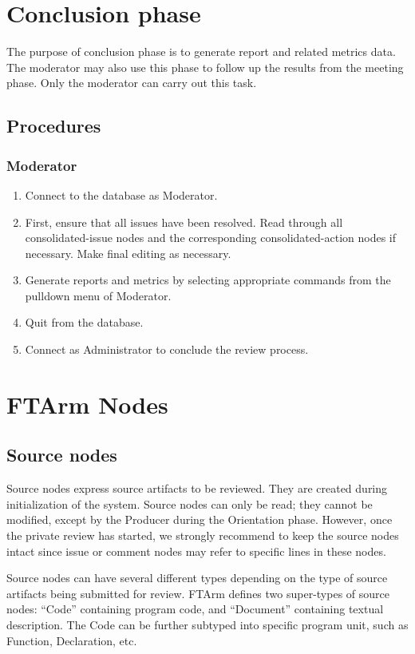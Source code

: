 \section {Conclusion phase}

The purpose of conclusion phase is to generate report and related
metrics data. 
The moderator may also use this phase to follow up the results from
the meeting phase.
Only the moderator can carry out this task.

\subsection {Procedures}
\subsubsection*{Moderator}
\begin{enumerate}
\item Connect to the database as Moderator.
\item First, ensure that all issues have been resolved. Read through
all consolidated-issue nodes and the corresponding consolidated-action
nodes if necessary. Make final editing as necessary.
\item Generate reports and metrics by selecting appropriate commands
from the pulldown menu of Moderator.
\item Quit from the database.
\item Connect as Administrator to conclude the review process. 
\end{enumerate}

\section {FTArm Nodes}
\subsection {Source nodes}
Source nodes express source artifacts to be reviewed. They are created
during initialization of the system. Source nodes can only be read;
they cannot be modified, except by the Producer during the Orientation
phase.
However, once the private review has started, we strongly recommend to
keep the source nodes intact since issue or comment nodes may refer to
specific lines in these nodes. 

Source nodes can have several different types depending on the type of
source artifacts being submitted for review.
FTArm defines two super-types of source nodes:
``Code'' containing program code, and ``Document'' containing 
textual description. The Code can be further subtyped into specific
program unit, such as Function, Declaration, etc.

